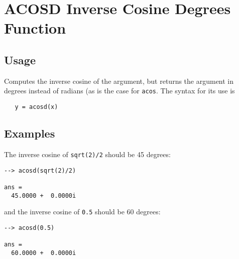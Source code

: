 \section{ACOSD Inverse Cosine Degrees Function}

\subsection{Usage}

Computes the inverse cosine of the argument, but returns
the argument in degrees instead of radians (as is the case
for \verb|acos|. The syntax for its use is
\begin{verbatim}
   y = acosd(x)
\end{verbatim}
\subsection{Examples}

The inverse cosine of \verb|sqrt(2)/2| should be 45 degrees:
\begin{verbatim}
--> acosd(sqrt(2)/2)

ans = 
  45.0000 +  0.0000i 
\end{verbatim}
and the inverse cosine of \verb|0.5| should be 60 degrees:
\begin{verbatim}
--> acosd(0.5)

ans = 
  60.0000 +  0.0000i 
\end{verbatim}
